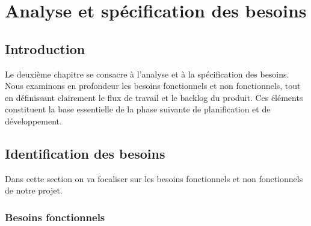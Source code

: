 \chapter{Analyse et spécification des besoins}

\section*{Introduction}
    \par Le deuxième chapitre se consacre à l'analyse et à la spécification des besoins. Nous examinons en profondeur les besoins fonctionnels et non fonctionnels, tout en définissant clairement le flux de travail et le backlog du produit. Ces éléments constituent la base essentielle de la phase suivante de planification et de développement.

\section{Identification des besoins}
\par Dans cette section on va focaliser sur les besoins fonctionnels et non fonctionnels de notre projet.
    \subsection{Besoins fonctionnels}

